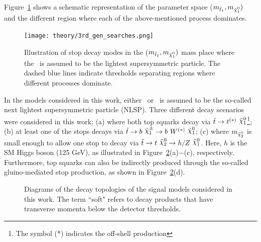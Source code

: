 				Figure~\ref{fig:stop_topologies} shows a schematic representation of the parameter space ($m_{\stopone}, m_{\ninoone})$ and the different region where each of the above-mentioned process dominates. %

				\begin{figure}[!htb]
					\centering
					\texttt{[image: theory/3rd\_gen\_searches.png]}
					\caption{\label{fig:stop_topologies} Illustration of stop decay modes in the ($m_{\stopone}, m_{\ninoone})$ mass place where the \ninoone\ is assumed to be the lightest supersymmetric particle. The dashed blue lines indicate thresholds separating regions where different processes dominate.}
				\end{figure}

				In the models considered in this work, either \ninotwo\ or \chinoonepm\ is assumed to be the so-called next lightest supersymmetric particle (NLSP). Three different decay scenarios were considered in this work; (a) where both top squarks decay via $\stop\rightarrow t^{(*)}\ \ninoone$\footnote{The symbol (*) indicates the off-shell production}; (b) at least one of the stops decays via $\stop\rightarrow b\ \chinoonepm \rightarrow b\ \Wboson^{(*)}\ \ninoone$; (c) where $m_{\ninotwo}$ is small enough to allow one stop to decay via $\stop\to t\ \ninotwo \to h/Z\ \ninoone$. Here, $h$ is the SM Higgs boson (125 GeV), as illustrated in Figure~\ref{fig:feynDiagModels}(a)$-$(c), respectively. Furthermore, top squarks can also be indirectly produced through the so-called gluino-mediated stop production, as shown in Figure~\ref{fig:feynDiagModels}(d).

				\begin{figure}[!htb]
					\begin{center}
						\hspace{0.05\textwidth}
						\hspace{0.05\textwidth}
						\hspace{0.05\textwidth}
						\hspace{0.05\textwidth}
					\end{center}
					\caption{Diagrams of the decay topologies of the signal models considered in this work. The term ``soft" refers to decay products that have transverse momenta below the detector thresholds.}
					\label{fig:feynDiagModels}
				\end{figure}

